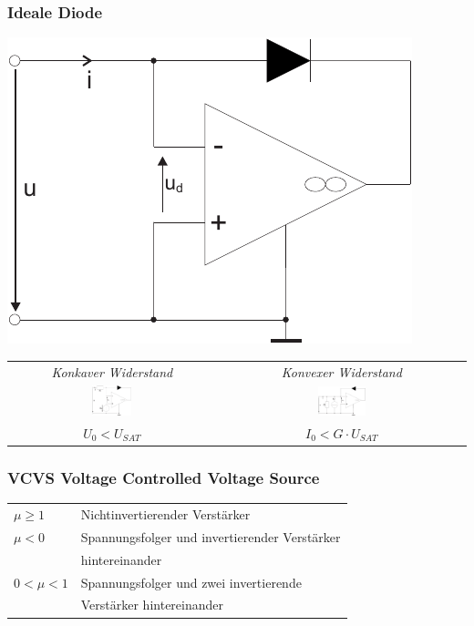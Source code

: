\documentclass[a4paper,twocolumn,10pt]{article}
\begin{document}
\subsubsection*{Ideale Diode}
\begin{minipage}[b]{0.2\textwidth}
\includegraphics[width=\textwidth]{Grafiken/OP_IdealeDiode}
\end{minipage}

\begin{tabular}{c|c}
	\emph{Konkaver Widerstand} & \emph{Konvexer Widerstand}\\
\includegraphics[width=0.2\textwidth]{Grafiken/OP_Rkonkav} & \includegraphics[width=0.2\textwidth]{Grafiken/OP_Rkonvex}\\
$U_0<U_{SAT}$ & $I_0<G\cdot U_{SAT}$
\end{tabular}

\subsubsection*{VCVS Voltage Controlled Voltage Source}
\begin{tabular}{ll}
$\mu\geq 1$ & Nichtinvertierender Verstärker\\
$\mu<0$ & Spannungsfolger und invertierender Verstärker\\
& hintereinander\\
$0<\mu<1$ & Spannungsfolger und zwei invertierende\\
& Verstärker hintereinander
\end{tabular}
\end{document}
